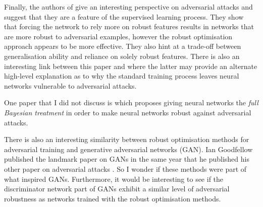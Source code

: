 \documentclass{article}
\begin{document}
Finally, the authors of \cite{ilyas2019adversarial} give an interesting perspective on adversarial attacks and suggest that they are a feature of the supervised learning process. They show that forcing the network to rely more on robust features results in networks that are more robust to adversarial examples, however the robust optimisation approach appears to be more effective. They also hint at a trade-off between generalisation ability and reliance on solely robust features. There is also an interesting link between this paper and \cite{geirhos2018imagenet} where the latter may provide an alternate high-level explanation as to why the standard training process leaves neural networks vulnerable to adversarial attacks.

One paper that I did not discuss is \cite{ye2018bayesian} which proposes giving neural networks the \textit{full Bayesian treatment} in order to make neural networks robust against adversarial attacks.

There is also an interesting similarity between robust optimisation methods for adversarial training and generative adversarial networks (GAN). Ian Goodfellow published the landmark paper on GANs in the same year that he published his other paper on adversarial attacks \cite{goodfellow2014explaining}. So I wonder if these methods were part of what inspired GANs. Furthermore, it would be interesting to see if the discriminator network part of GANs exhibit a similar level of adversarial robustness as networks trained with the robust optimisation methods.



\end{document}

